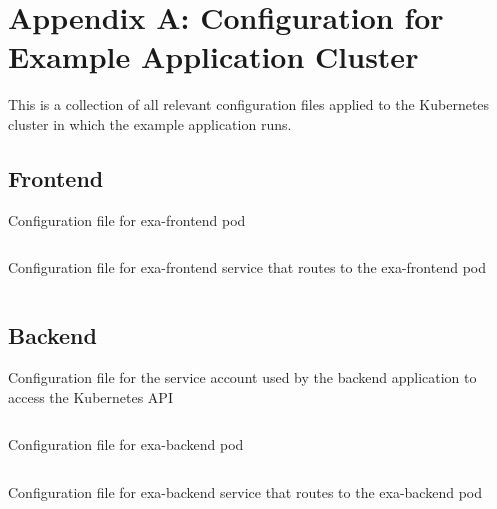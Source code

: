 \chapter*{Appendix A: Configuration for Example Application Cluster} \label{apx:A}

This is a collection of all relevant configuration files applied to the Kubernetes cluster in which the example application runs.

\section*{Frontend}

\begin{listing}[H]    
	\caption{Configuration file for exa-frontend pod}    
    \inputminted[autogobble, frame=single, linenos]{yaml}{yaml/exa-frontend/exa-frontend-pod.yaml}
\end{listing}  

\begin{listing}[H]    
	\caption{Configuration file for exa-frontend service that routes to the exa-frontend pod}  
	\inputminted[autogobble, frame=single, linenos]{yaml}{yaml/exa-frontend/exa-frontend-service.yaml}
\end{listing}  


\section*{Backend}

\begin{listing}[H]    
	\caption{Configuration file for the service account used by the backend application to access the Kubernetes API}  
	\inputminted[autogobble, frame=single, linenos]{yaml}{yaml/exa-backend/exa-backend-sa.yaml}
	\label{lst:exa-backend-sa}    
\end{listing}  

\begin{listing}[H]    
	\caption{Configuration file for exa-backend pod}  
	\inputminted[autogobble, frame=single, linenos]{yaml}{yaml/exa-backend/exa-backend-pod.yaml}
\end{listing}  

\begin{listing}[H]    
	\caption{Configuration file for exa-backend service that routes to the exa-backend pod} 
	\inputminted[autogobble, frame=single, linenos]{yaml}{yaml/exa-backend/exa-backend-service}
\end{listing}  

